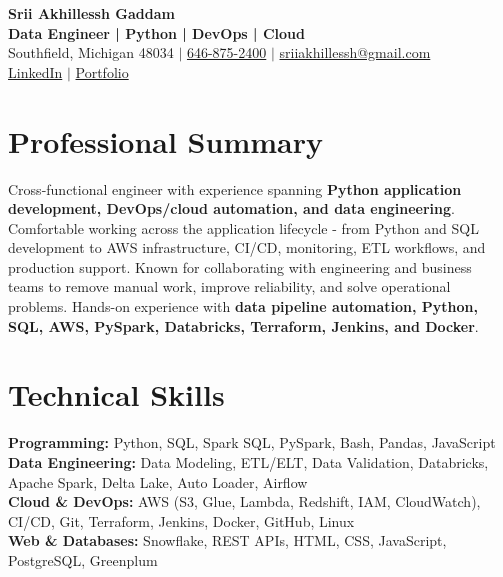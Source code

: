 \documentclass[letterpaper,10pt]{article}
\begin{document}
\fontsize{9.35pt}{10.45pt}\selectfont

\begin{center}
    {\LARGE \textbf{Srii Akhillessh Gaddam}} \\[-1pt]
    \textbf{Data Engineer | Python | DevOps | Cloud} \\[2pt]
    Southfield, Michigan 48034 $|$
    \href{tel:6468752400}{646-875-2400} $|$
    \href{mailto:sriiakhillessh@gmail.com}{sriiakhillessh@gmail.com} \\[1pt]
    \href{https://www.linkedin.com/in/srii-akhiilessh-gaddam-b48668191/}{LinkedIn} $|$
    \href{https://sriiakhillesshg.github.io/portfolio/}{Portfolio}
\end{center}
\vspace{-8pt}

\section{Professional Summary}
\small{Cross-functional engineer with experience spanning \textbf{Python application development, DevOps/cloud automation, and data engineering}. Comfortable working across the application lifecycle - from Python and SQL development to AWS infrastructure, CI/CD, monitoring, ETL workflows, and production support. Known for collaborating with engineering and business teams to remove manual work, improve reliability, and solve operational problems. Hands-on experience with \textbf{data pipeline automation, Python, SQL, AWS, PySpark, Databricks, Terraform, Jenkins, and Docker}.}

\section{Technical Skills}
\small{
\textbf{Programming:} Python, SQL, Spark SQL, PySpark, Bash, Pandas, JavaScript \\
\textbf{Data Engineering:} Data Modeling, ETL/ELT, Data Validation, Databricks, Apache Spark, Delta Lake, Auto Loader, Airflow \\
\textbf{Cloud \& DevOps:} AWS (S3, Glue, Lambda, Redshift, IAM, CloudWatch), CI/CD, Git, Terraform, Jenkins, Docker, GitHub, Linux \\
\textbf{Web \& Databases:} Snowflake, REST APIs, HTML, CSS, JavaScript, PostgreSQL, Greenplum
}

\end{document}
